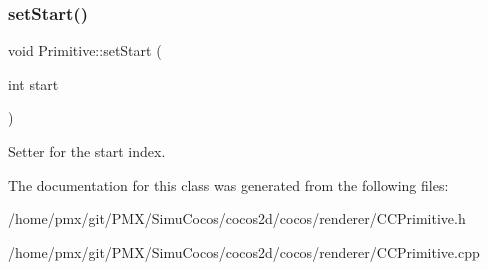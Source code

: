 \subsubsection{\texorpdfstring{set\+Start()}{setStart()}\hspace{0.1cm}{\footnotesize\ttfamily [2/2]}}
{\footnotesize\ttfamily void Primitive\+::set\+Start (\begin{DoxyParamCaption}\item[{int}]{start }\end{DoxyParamCaption})}

Setter for the start index. 

The documentation for this class was generated from the following files\+:\begin{DoxyCompactItemize}
\item 
/home/pmx/git/\+P\+M\+X/\+Simu\+Cocos/cocos2d/cocos/renderer/C\+C\+Primitive.\+h\item 
/home/pmx/git/\+P\+M\+X/\+Simu\+Cocos/cocos2d/cocos/renderer/C\+C\+Primitive.\+cpp\end{DoxyCompactItemize}
